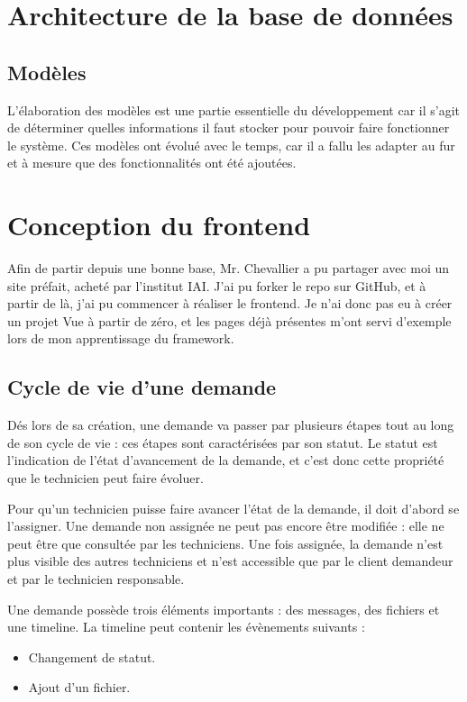 \documentclass[
    iai, %
    eai, %
]{heig-tb}
\begin{document}
\chapter{Architecture de la base de données}
\section{Modèles}
L'élaboration des modèles est une partie essentielle du développement car il s'agit de déterminer quelles informations il faut stocker pour pouvoir faire fonctionner le système.
Ces modèles ont évolué avec le temps, car il a fallu les adapter au fur et à mesure que des fonctionnalités ont été ajoutées.

\chapter{Conception du frontend}
Afin de partir depuis une bonne base, Mr. Chevallier a pu partager avec moi un site préfait, acheté par l'institut IAI.
J'ai pu forker le repo sur GitHub, et à partir de là, j'ai pu commencer à réaliser le frontend.
Je n'ai donc pas eu à créer un projet Vue à partir de zéro, et les pages déjà présentes m'ont servi d'exemple lors de mon apprentissage du framework.

\section{Cycle de vie d'une demande}
Dés lors de sa création, une demande va passer par plusieurs étapes tout au long de son cycle de vie : ces étapes sont caractérisées par son statut.
Le statut est l'indication de l'état d'avancement de la demande, et c'est donc cette propriété que le technicien peut faire évoluer.

Pour qu'un technicien puisse faire avancer l'état de la demande, il doit d'abord se l'assigner.
Une demande non assignée ne peut pas encore être modifiée : elle ne peut être que consultée par les techniciens.
Une fois assignée, la demande n'est plus visible des autres techniciens et n'est accessible que par le client demandeur et par le technicien responsable.

Une demande possède trois éléments importants : des messages, des fichiers et une timeline.
La timeline peut contenir les évènements suivants :
\begin{itemize}
  \item Changement de statut.
  \item Ajout d'un fichier.
\end{itemize}
\bigskip
\end{document}
